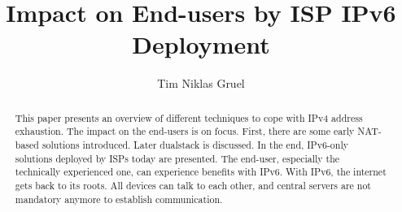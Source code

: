 \documentclass[format=sigconf, natbib=true, nonacm=true]{acmart}
\begin{document}
    \title{Impact on End-users by ISP IPv6 Deployment}

    \author{Tim Niklas Gruel}

    \begin{abstract}
        This paper presents an overview of different techniques to cope with IPv4 address exhaustion. The impact on the end-users is on focus. First, there are some early NAT-based solutions introduced. Later dualstack is discussed. In the end, IPv6-only solutions deployed by ISPs today are presented. The end-user, especially the technically experienced one, can experience benefits with IPv6. With IPv6, the internet gets back to its roots. All devices can talk to each other, and central servers are not mandatory anymore to establish communication.
    \end{abstract}



    \maketitle
\end{document}
